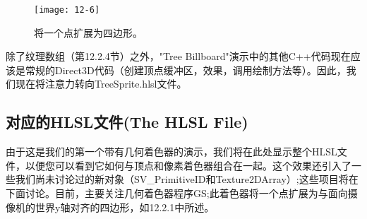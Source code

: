 \begin{figure}[h]
    \texttt{[image: 12-6]}
    \centering
    \caption{将一个点扩展为四边形。}
    \label{fig:12-6}
\end{figure}

\begin{flushleft}
除了纹理数组（第12.2.4节）之外，"Tree Billboard"演示中的其他C++代码现在应该是常规的Direct3D代码（创建顶点缓冲区，效果，调用绘制方法等）。因此，我们现在将注意力转向TreeSprite.hlsl文件。
\end{flushleft}

\subsection{对应的HLSL文件(The HLSL File)}
\begin{flushleft}
由于这是我们的第一个带有几何着色器的演示，我们将在此处显示整个HLSL文件，以便您可以看到它如何与顶点和像素着色器组合在一起。这个效果还引入了一些我们尚未讨论过的新对象（SV_PrimitiveID和Texture2DArray）;这些项目将在下面讨论。目前，主要关注几何着色器程序GS;此着色器将一个点扩展为与面向摄像机的世界y轴对齐的四边形，如12.2.1中所述。\\
\end{flushleft}

